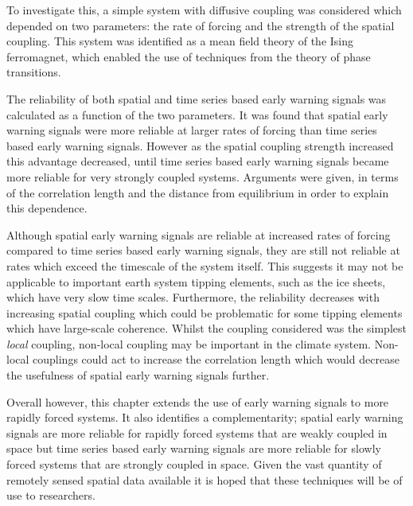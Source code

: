 To investigate this, a simple system with diffusive coupling was considered which depended on two parameters: the rate of forcing and the strength of the spatial coupling.
This system was identified as a mean field theory of the Ising ferromagnet, which enabled the use of techniques from the theory of phase transitions.

The reliability of both spatial and time series based early warning signals was calculated as a function of the two parameters.
It was found that spatial early warning signals were more reliable at larger rates of forcing than time series based early warning signals. However as the spatial coupling
strength increased this advantage decreased, until time series based early warning signals became more reliable for very strongly coupled systems. Arguments were given, in terms of the correlation
length and the distance from equilibrium in order to explain this dependence.

Although spatial early warning signals are reliable at increased rates of forcing compared to time series based early warning signals, they are still not reliable at rates which exceed
the timescale of the system itself. This suggests it may not be applicable to important earth system tipping elements, such as the ice sheets, which have very slow time scales. Furthermore, the reliability decreases with
increasing spatial coupling which could be problematic for some tipping elements which have large-scale coherence. Whilst the coupling considered was the simplest \emph{local} coupling, non-local
coupling may be important in the climate system. Non-local couplings could act to increase the correlation length which would decrease the usefulness of spatial early warning signals further.

Overall however, this chapter extends the use of early warning signals to more rapidly forced systems. It also identifies a complementarity; spatial early warning signals are more reliable
for rapidly forced systems that are weakly coupled in space but time series based early warning signals are more reliable for slowly forced systems that are strongly coupled in space.
Given the vast quantity of remotely sensed spatial data available \parencite{Campbell2011} it is hoped that these techniques will be of use to researchers.

\subsubsection{}

